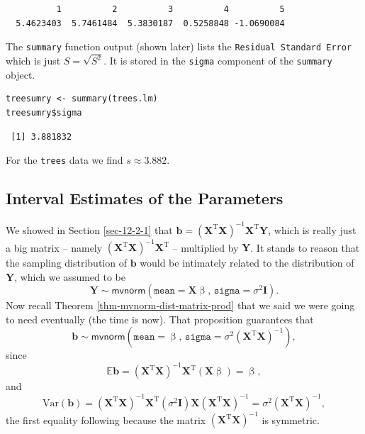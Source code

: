 \documentclass[captions=tableheading]{scrbook}
\begin{document}
\begin{verbatim}
          1          2          3          4          5 
  5.4623403  5.7461484  5.3830187  0.5258848 -1.0690084
\end{verbatim}

The \texttt{summary} function output (shown later) lists the \texttt{Residual Standard Error} which is just \(S=\sqrt{S^{2}}\). It is stored in the \texttt{sigma} component of the \texttt{summary} object.


\lstset{language=R}
\begin{lstlisting}
treesumry <- summary(trees.lm)
treesumry$sigma
\end{lstlisting}

\begin{verbatim}
 [1] 3.881832
\end{verbatim}

For the \texttt{trees} data we find \(s\approx  3.882 \).
\subsection{Interval Estimates of the Parameters}
\label{sec-12-2-4}
\label{sub-mlr-interval-est-params}


We showed in Section \ref{sec-12-2-1} that \(\mathbf{b}=\left(\mathbf{X}^{\mathrm{T}}\mathbf{X}\right)^{-1}\mathbf{X}^{\mathrm{T}}\mathbf{Y}\), which is really just a big matrix -- namely \(\left(\mathbf{X}^{\mathrm{T}}\mathbf{X}\right)^{-1}\mathbf{X}^{\mathrm{T}}\) -- multiplied by \(\mathbf{Y}\). It stands to reason that the sampling distribution of \(\mathbf{b}\) would be intimately related to the distribution of \(\mathbf{Y}\), which we assumed to be
\begin{equation}
\mathbf{Y}\sim\mathsf{mvnorm}\left(\mathtt{mean}=\mathbf{X}\upbeta,\,\mathtt{sigma}=\sigma^{2}\mathbf{I}\right).
\end{equation}
Now recall Theorem \ref{thm-mvnorm-dist-matrix-prod} that we said we were going to need eventually (the time is now). That proposition guarantees that
\begin{equation}
\mathbf{b}\sim\mathsf{mvnorm}\left(\mathtt{mean}=\upbeta,\,\mathtt{sigma}=\sigma^{2}\left(\mathbf{X}^{\mathrm{T}}\mathbf{X}\right)^{-1}\right),\label{eq-distn-b-mlr}
\end{equation}
since
\begin{equation}
\mathbb{E}\mathbf{b}=\left(\mathbf{X}^{\mathrm{T}}\mathbf{X}\right)^{-1}\mathbf{X}^{\mathrm{T}}(\mathbf{X}\upbeta)=\upbeta,
\end{equation}
and
\begin{equation}
\mbox{Var}(\mathbf{b})=\left(\mathbf{X}^{\mathrm{T}}\mathbf{X}\right)^{-1}\mathbf{X}^{\mathrm{T}}(\sigma^{2}\mathbf{I})\mathbf{X}\left(\mathbf{X}^{\mathrm{T}}\mathbf{X}\right)^{-1}=\sigma^{2}\left(\mathbf{X}^{\mathrm{T}}\mathbf{X}\right)^{-1},
\end{equation}
the first equality following because the matrix \(\left(\mathbf{X}^{\mathrm{T}}\mathbf{X}\right)^{-1}\) is symmetric.
\end{document}
